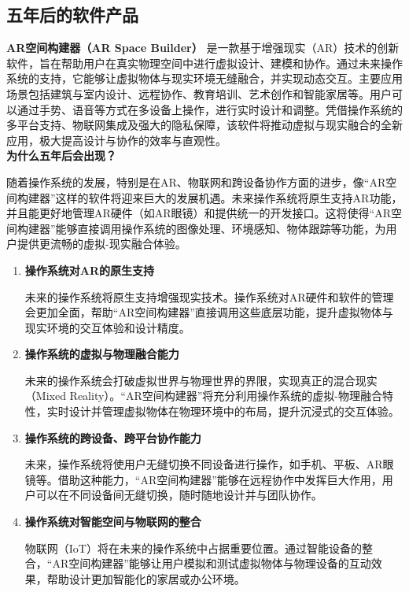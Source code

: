 \documentclass[UTF8]{homework}
\begin{document}
\begin{homeworkProblem}
	
\subsection{五年后的软件产品}

\textbf{AR空间构建器（AR Space Builder）} 是一款基于增强现实（AR）技术的创新软件，旨在帮助用户在真实物理空间中进行虚拟设计、建模和协作。通过未来操作系统的支持，它能够让虚拟物体与现实环境无缝融合，并实现动态交互。主要应用场景包括建筑与室内设计、远程协作、教育培训、艺术创作和智能家居等。用户可以通过手势、语音等方式在多设备上操作，进行实时设计和调整。凭借操作系统的多平台支持、物联网集成及强大的隐私保障，该软件将推动虚拟与现实融合的全新应用，极大提高设计与协作的效率与直观性。\\

\textbf{为什么五年后会出现？}

随着操作系统的发展，特别是在AR、物联网和跨设备协作方面的进步，像“AR空间构建器”这样的软件将迎来巨大的发展机遇。未来操作系统将原生支持AR功能，并且能更好地管理AR硬件（如AR眼镜）和提供统一的开发接口。这将使得“AR空间构建器”能够直接调用操作系统的图像处理、环境感知、物体跟踪等功能，为用户提供更流畅的虚拟-现实融合体验。

\begin{enumerate}
	\item \textbf{操作系统对AR的原生支持}  
	
	未来的操作系统将原生支持增强现实技术。操作系统对AR硬件和软件的管理会更加全面，帮助“AR空间构建器”直接调用这些底层功能，提升虚拟物体与现实环境的交互体验和设计精度。
	
	\item \textbf{操作系统的虚拟与物理融合能力}  
	
	未来的操作系统会打破虚拟世界与物理世界的界限，实现真正的混合现实（Mixed Reality）。“AR空间构建器”将充分利用操作系统的虚拟-物理融合特性，实时设计并管理虚拟物体在物理环境中的布局，提升沉浸式的交互体验。
	
	\item \textbf{操作系统的跨设备、跨平台协作能力}  
	
	未来，操作系统将使用户无缝切换不同设备进行操作，如手机、平板、AR眼镜等。借助这种能力，“AR空间构建器”能够在远程协作中发挥巨大作用，用户可以在不同设备间无缝切换，随时随地设计并与团队协作。
	
	\item \textbf{操作系统对智能空间与物联网的整合}  
	
	物联网（IoT）将在未来的操作系统中占据重要位置。通过智能设备的整合，“AR空间构建器”能够让用户模拟和测试虚拟物体与物理设备的互动效果，帮助设计更加智能化的家居或办公环境。
	

\end{enumerate}
\end{homeworkProblem}
\end{document}
